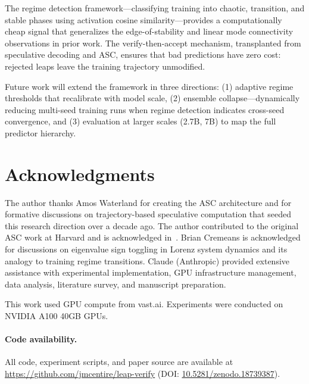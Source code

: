 \documentclass{article}
\begin{document}
The regime detection framework---classifying training into chaotic, transition, and stable phases using activation cosine similarity---provides a computationally cheap signal that generalizes the edge-of-stability and linear mode connectivity observations in prior work.
The verify-then-accept mechanism, transplanted from speculative decoding and ASC, ensures that bad predictions have zero cost: rejected leaps leave the training trajectory unmodified.

Future work will extend the framework in three directions: (1) adaptive regime thresholds that recalibrate with model scale, (2) ensemble collapse---dynamically reducing multi-seed training runs when regime detection indicates cross-seed convergence, and (3) evaluation at larger scales (2.7B, 7B) to map the full predictor hierarchy.

\section*{Acknowledgments}

The author thanks Amos Waterland for creating the ASC architecture and for formative discussions on trajectory-based speculative computation that seeded this research direction over a decade ago.
The author contributed to the original ASC work at Harvard and is acknowledged in~\citet{waterland2014asc}.
Brian Cremeans is acknowledged for discussions on eigenvalue sign toggling in Lorenz system dynamics and its analogy to training regime transitions.
Claude (Anthropic) provided extensive assistance with experimental implementation, GPU infrastructure management, data analysis, literature survey, and manuscript preparation.

This work used GPU compute from vast.ai.
Experiments were conducted on NVIDIA A100 40GB GPUs.

\paragraph{Code availability.}
All code, experiment scripts, and paper source are available at \url{https://github.com/jmcentire/leap-verify} (DOI: \href{https://doi.org/10.5281/zenodo.18739387}{10.5281/zenodo.18739387}).



\end{document}
